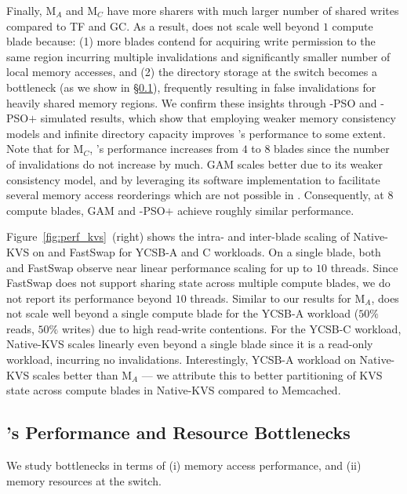 Finally, M$_A$ and M$_C$ have more sharers with much larger number of shared writes compared to TF and GC. As a result, \mind does not scale well beyond $1$ compute blade because: (1) more blades contend for acquiring write permission to the same region incurring multiple invalidations and significantly smaller number of local memory accesses, and (2) the directory storage at the switch becomes a bottleneck (as we show in \S\ref{ssec:bottlenecks}), frequently resulting in false invalidations for heavily shared memory regions. We confirm these insights through \mind-PSO and \mind-PSO$+$ simulated results, which show that employing weaker memory consistency models and infinite directory capacity improves \mind's performance to some extent. Note that for M$_C$, \mind's performance increases from $4$ to $8$ blades since the number of invalidations do not increase by much. GAM scales better due to its weaker consistency model, and by leveraging its software implementation to facilitate several memory access reorderings which are not possible in \mind. Consequently, at $8$ compute blades, GAM and \mind-PSO$+$ achieve roughly similar performance.

 Figure~\ref{fig:perf_kvs}~(right) shows the intra- and inter-blade scaling of Native-KVS on \mind and FastSwap for YCSB-A and C workloads. On a single blade, both \mind and FastSwap observe near linear performance scaling for up to $10$ threads. Since FastSwap does not support sharing state across multiple compute blades, we do not report its performance beyond $10$ threads. Similar to our results for M$_A$, \mind does not scale well beyond a single compute blade for the YCSB-A workload ($50\%$ reads, $50\%$ writes) due to high read-write contentions. For the YCSB-C workload, Native-KVS scales linearly even beyond a single blade since it is a read-only workload, incurring no invalidations. Interestingly, YCSB-A workload on Native-KVS scales better than M$_A$ --- we attribute this to better partitioning of KVS state across compute blades in Native-KVS compared to Memcached.

\subsection{\mind's Performance and Resource Bottlenecks}
\label{ssec:bottlenecks}

We study \mind bottlenecks in terms of (i) memory access performance, and (ii) memory resources at the switch.

